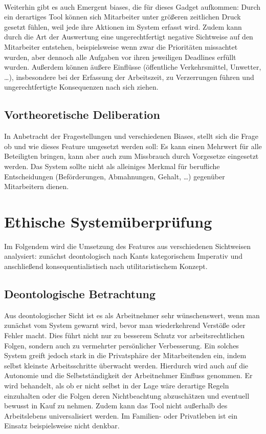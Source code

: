 \documentclass[a4paper,12pt,]{article}
\begin{document}
\paragraph{}Weiterhin gibt es auch Emergent biases, die für dieses Gadget aufkommen: Durch ein derartiges Tool können sich Mitarbeiter unter größeren zeitlichen Druck gesetzt fühlen, weil jede ihre Aktionen im System erfasst wird.
Zudem kann durch die Art der Auswertung eine ungerechtfertigt negative Sichtweise auf den Mitarbeiter entstehen, beispielsweise wenn zwar die Prioritäten missachtet wurden, aber dennoch alle Aufgaben vor ihren jeweiligen Deadlines erfüllt wurden.
Außerdem können äußere Einflüsse (öffentliche Verkehrsmittel, Unwetter, …), insbesondere bei der Erfassung der Arbeitszeit, zu Verzerrungen führen und ungerechtfertigte Konsequenzen nach sich ziehen.

\subsection{Vortheoretische Deliberation}
In Anbetracht der Fragestellungen und verschiedenen Biases, stellt sich die Frage ob und wie dieses Feature umgesetzt werden soll: Es kann einen Mehrwert für alle Beteiligten bringen, kann aber auch zum Missbrauch durch Vorgesetze eingesetzt werden. Das System sollte nicht als alleiniges Merkmal für berufliche Entscheidungen (Beförderungen, Abmahnungen, Gehalt, …) gegenüber Mitarbeitern dienen.

\section{Ethische Systemüberprüfung}

Im Folgendem wird die Umsetzung des Features aus verschiedenen
Sichtweisen analysiert: zunächst deontologisch nach Kants kategorischem
Imperativ und anschließend konsequentialistisch nach utilitaristischem
Konzept.

\subsection{Deontologische Betrachtung}

Aus deontologischer Sicht ist es als Arbeitnehmer sehr wünschenswert, wenn man zunächst vom System gewarnt wird, bevor man wiederkehrend Verstöße oder Fehler macht. Dies führt nicht nur zu besserem Schutz vor arbeitsrechtlichen Folgen, sondern auch zu vermehrter persönlicher Verbesserung.
Ein solches System greift jedoch stark in die Privatsphäre der Mitarbeitenden ein, indem selbst kleinste Arbeitsschritte überwacht werden. Hierdurch wird auch auf die Autonomie und die Selbstständigkeit der Arbeitnehmer Einfluss genommen. Er wird behandelt, als ob er nicht selbst in der Lage wäre derartige Regeln einzuhalten oder die Folgen deren Nichtbeachtung abzuschätzen und eventuell bewusst in Kauf zu nehmen.
Zudem kann das Tool nicht außerhalb des Arbeitslebens universalisiert werden. Im Familien- oder Privatleben ist ein Einsatz beispielsweise nicht denkbar.
\end{document}
